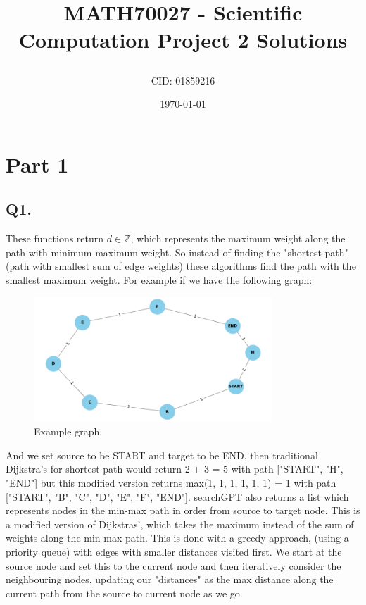 \documentclass[a4paper, oneside]{book}
\title{MATH70027 - Scientific Computation Project 2 Solutions\author{CID: 01859216}\date{\today}}
\begin{document}
\maketitle


\section*{Part 1}
\subsection*{Q1.}
These functions return $d \in \mathbb{Z}$, which represents the maximum weight along the path with minimum maximum weight. So instead of finding the "shortest path" (path with smallest sum of edge weights) these algorithms find the path with the smallest maximum weight.
For example if we have the following graph:

\begin{figure}[htpb]
    \centering
    \includegraphics[width=0.8\textwidth]{./images/example_graph.png}
    \caption{Example graph.}
\end{figure}

And we set source to be START and target to be END, then traditional Dijkstra's for shortest
path would return 2 + 3 = 5 with path ["START", "H", "END"] but this modified version returns
max(1, 1, 1, 1, 1, 1) = 1 with path ["START", "B", "C", "D", "E", "F", "END"].
searchGPT also returns a list which represents nodes in the min-max path in order from source to target node.
This is a modified version of Dijkstras', which takes the maximum instead of the sum of
weights along the min-max path. This is done with a greedy approach, (using a priority queue) with edges with smaller distances visited first. We start at the source node and set this to the current node and then iteratively consider the neighbouring nodes, updating our "distances" as the max distance along the current path from the source to current node as we go.
\end{document}
